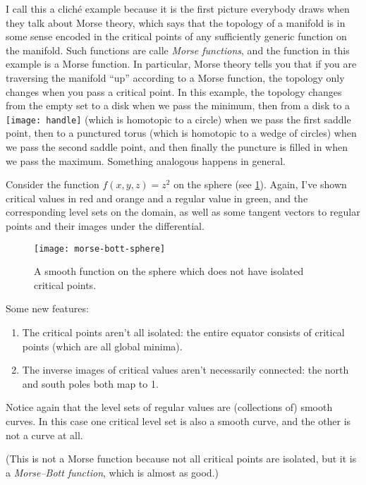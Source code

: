 \begin{remark}
	I call this a cliché example because it is the first picture everybody draws when they talk about Morse theory, which says that the topology of a manifold is in some sense encoded in the critical points of any sufficiently generic function on the manifold. Such functions are calle \emph{Morse functions}, and the function in this example is a Morse function. In particular, Morse theory tells you that if you are traversing the manifold ``up'' according to a Morse function, the topology only changes when you pass a critical point. In this example, the topology changes from the empty set to a disk when we pass the minimum, then from a disk to a \texttt{[image: handle]} (which is homotopic to a circle) when we pass the first saddle point, then to a punctured torus (which is homotopic to a wedge of circles) when we pass the second saddle point, and then finally the puncture is filled in when we pass the maximum. Something analogous happens in general.
\end{remark}

\begin{example}
	Consider the function $f(x,y,z) = z^2$ on the sphere (see \cref{fig:sphere}). Again, I've shown critical values in red and orange and a regular value in green, and the corresponding level sets on the domain, as well as some tangent vectors to regular points and their images under the differential.
	
		\begin{figure}[htbp]
			\centering
				\texttt{[image: morse-bott-sphere]}
			\caption{A smooth function on the sphere which does not have isolated critical points.}
			\label{fig:sphere}
		\end{figure}
	
	Some new features:
	\begin{enumerate}
		\item The critical points aren't all isolated: the entire equator consists of critical points (which are all global minima).
		
		\item The inverse images of critical values aren't necessarily connected: the north and south poles both map to 1.
	\end{enumerate}
	
	Notice again that the level sets of regular values are (collections of) smooth curves. In this case one critical level set is also a smooth curve, and the other is not a curve at all.
	
	(This is not a Morse function because not all critical points are isolated, but it is a \emph{Morse–Bott function}, which is almost as good.)
	\end{example}
	
